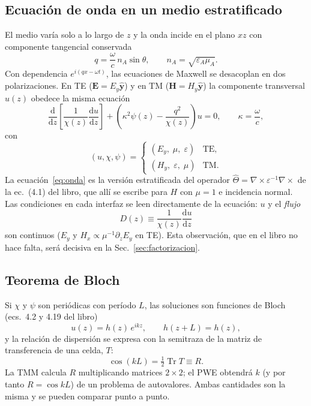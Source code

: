 \documentclass[11pt,a4paper]{article}
\newcommand{\dd}{\mathrm{d}}
\begin{document}
\subsection{Ecuación de onda en un medio estratificado}

El medio varía solo a lo largo de $z$ y la onda incide en el plano $xz$ con
componente tangencial conservada
\begin{equation}
q=\frac{\omega}{c}\,n_A\sin\theta,\qquad n_A=\sqrt{\varepsilon_A\mu_A}.
\end{equation}
Con dependencia $e^{i(qx-\omega t)}$, las ecuaciones de Maxwell se desacoplan en
dos polarizaciones. En TE ($\mathbf E=E_y\hat{\mathbf y}$) y en TM
($\mathbf H=H_y\hat{\mathbf y}$) la componente transversal $u(z)$ obedece la
misma ecuación
\begin{equation}
\boxed{\;\frac{\dd}{\dd z}\!\left[\frac{1}{\chi(z)}\frac{\dd u}{\dd z}\right]
+\left(\kappa^2\psi(z)-\frac{q^2}{\chi(z)}\right)u=0,\qquad \kappa=\frac{\omega}{c},\;}
\label{eq:onda}
\end{equation}
con
\begin{equation}
(u,\chi,\psi)=
\begin{cases}
(E_y,\;\mu,\;\varepsilon) & \text{TE},\\
(H_y,\;\varepsilon,\;\mu) & \text{TM}.
\end{cases}
\end{equation}
La ecuación~\eqref{eq:onda} es la versión estratificada del operador
$\hat\Theta=\nabla\times\varepsilon^{-1}\nabla\times$ de la ec.~(4.1) del libro,
que allí se escribe para $H$ con $\mu=1$ e incidencia normal. Las condiciones
en cada interfaz se leen directamente de la ecuación: $u$ y el \emph{flujo}
\begin{equation}
D(z)\equiv\frac{1}{\chi(z)}\frac{\dd u}{\dd z}
\label{eq:flujo}
\end{equation}
son continuos ($E_y$ y $H_x\propto\mu^{-1}\partial_zE_y$ en TE). Esta
observación, que en el libro no hace falta, será decisiva en la
Sec.~\ref{sec:factorizacion}.

\subsection{Teorema de Bloch}

Si $\chi$ y $\psi$ son periódicas con período $L$, las soluciones son funciones
de Bloch (ecs.~4.2 y 4.19 del libro)
\begin{equation}
u(z)=h(z)\,e^{ikz},\qquad h(z+L)=h(z),
\label{eq:bloch}
\end{equation}
y la relación de dispersión se expresa con la semitraza de la matriz de
transferencia de una celda, $T$:
\begin{equation}
\cos(kL)=\tfrac12\operatorname{Tr}T\equiv R.
\label{eq:semitraza}
\end{equation}
La TMM calcula $R$ multiplicando matrices $2\times2$; el PWE obtendrá $k$ (y por
tanto $R=\cos kL$) de un problema de autovalores. Ambas cantidades son la misma y
se pueden comparar punto a punto.
\end{document}

